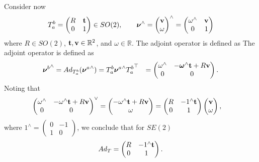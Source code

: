 Consider now 
\[
T_a^b = \begin{pmatrix} R & \mathbf{t} \\ 0 & 1 \end{pmatrix} \in SO(2), \qquad \boldsymbol{\nu}^\wedge = \begin{pmatrix} \mathbf{v} \\ \omega \end{pmatrix}^\wedge = \begin{pmatrix} \omega^\wedge & \mathbf{v} \\ 0 & 1 \end{pmatrix}
\]
where $R\in SO(2)$, $\mathbf{t}, \mathbf{v} \in \mathbb{R}^2$, and $\omega\in\mathbb{R}$.
The adjoint operator is defined as
The adjoint operator is defined as
\begin{align*}
{\boldsymbol{\nu}^b}^\wedge = Ad_{T_a^b}({\boldsymbol{\nu}^a}^\wedge) &= T_a^b {\boldsymbol{\nu}^a}^\wedge {T_a^b}^\top 
	&= \begin{pmatrix} \omega^\wedge & -\boldsymbol{\omega}^\wedge \mathbf{t} + R\mathbf{v} \\ 0 & 0 \end{pmatrix}.
\end{align*}
Noting that 
\begin{align*}
\begin{pmatrix} \omega^\wedge & -\omega^\wedge \mathbf{t} + R\mathbf{v} \\ 0 & 0 \end{pmatrix}^\vee 
	&= \begin{pmatrix} 	-\omega^\wedge \mathbf{t} + R\mathbf{v} \\ \omega \end{pmatrix} 
	= \begin{pmatrix} R & -1^\wedge\mathbf{t} \\ 0 & 1 \end{pmatrix}\begin{pmatrix} \mathbf{v} \\ \omega \end{pmatrix},
\end{align*}
where $1^\wedge = \begin{pmatrix} 0 & -1 \\ 1 & 0 \end{pmatrix}$, we conclude that for $SE(2)$
\[
Ad_T = \begin{pmatrix} R & -1^\wedge\mathbf{t} \\ 0 & 1 \end{pmatrix}.
\]

